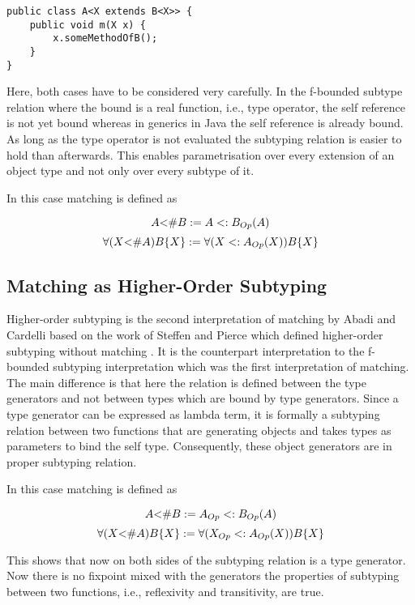 \begin{lstlisting}[float=ht,caption={Universal quantified f-bound in Java},label={lst:generics}]
public class A<X extends B<X>> {
	public void m(X x) {
		x.someMethodOfB();
	}
}
\end{lstlisting}

Here, both cases have to be considered very carefully. In the f-bounded subtype
relation where the bound is a real function, i.e., type operator,
the self reference is not yet bound whereas in generics in Java the self
reference is already bound. As long as the type operator is not evaluated
the subtyping relation is easier to hold than afterwards. This enables
parametrisation over every extension of an object type and not only over
every subtype of it.

In this case matching is defined as\cite{abadi_subtyping_1996}
\begin{defn}
	\label{def:matchingAsBound}
	\[A \textnormal{<\#} B := A <: B_{Op}(A)\]
	\[\forall (X \textnormal{<\#} A)B\{X\} := \forall (X <: A_{Op}(X))B\{X\}\]
\end{defn}

\subsection{Matching as Higher-Order Subtyping}
Higher-order subtyping is the second interpretation of matching
by Abadi and Cardelli \cite{abadi_subtyping_1996} based on the work
of Steffen and Pierce which defined higher-order subtyping without
matching \cite{steffen_higher-order_1994}. It is the counterpart
interpretation to the f-bounded subtyping interpretation which was
the first interpretation of matching. The main difference is that here the relation is
defined between the type generators and not between types which are bound
by type generators. Since a type generator can be expressed as lambda
term, it is formally a subtyping relation between two functions that are
generating objects and takes types as parameters to bind the self type.
Consequently, these object generators are in proper subtyping relation.

In this case matching is defined as\cite{abadi_subtyping_1996}
\begin{defn}
	\label{def:matchingAsHigherOrder}
	\[A \textnormal{<\#} B := A_{Op} <: B_{Op}(A)\]
	\[\forall (X \textnormal{<\#} A)B\{X\} := \forall (X_{Op} <: A_{Op}(X))B\{X\}\]
\end{defn}

This shows that now on both sides of the subtyping relation is a type
generator. Now there is no fixpoint mixed with the generators
the properties of subtyping between two functions, i.e., reflexivity
and transitivity, are true.
